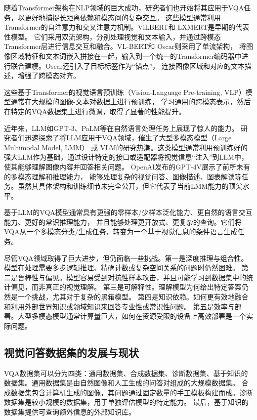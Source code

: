 随着Transformer架构在NLP领域的巨大成功，研究者们也开始将其应用于VQA任务，以更好地捕捉长距离依赖和模态间的复杂交互。
这些模型通常利用Transformer的自注意力和交叉注意力机制。ViLBERT\cite{lu2019vilbert}和 LXMERT\cite{tan2019lxmert}是早期的代表性模型。
它们采用双流架构，分别处理视觉和文本输入，并通过跨模态Transformer层进行信息交互和融合。VL-BERT\cite{su2019vl}和 Oscar\cite{li2020oscar}则采用了单流架构，
将图像区域特征和文本词嵌入拼接在一起，输入到一个统一的Transformer编码器中进行联合建模。Oscar还引入了目标标签作为“锚点”，
连接图像区域和对应的文本描述，增强了跨模态对齐。

这些基于Transformer的视觉语言预训练（Vision-Language Pre-training, VLP）模型通常在大规模的图像-文本对数据上进行预训练，
学习通用的跨模态表示，然后在特定的VQA数据集上进行微调，取得了显著的性能提升。

近年来，LLM如GPT-3、PaLM等在自然语言处理任务上展现了惊人的能力。
研究者们迅速探索了将LLM应用于VQA领域，催生了大型多模态模型（Large Multimodal Model, LMM） 或 
VLM的研究热潮。这类模型通常利用预训练好的强大LLM作为基础，通过设计特定的接口或适配器将视觉信息“注入”到LLM中，使其能够理解图像内容并回答相关问题。
OpenAI发布的GPT-4V\cite{openai2023gpt4v}展示了前所未有的多模态理解和推理能力，
能够处理复杂的视觉问答、图像描述、图表解读等任务。虽然其具体架构和训练细节未完全公开，但它代表了当前LMM能力的顶尖水平。

基于LLM的VQA模型通常具有更强的零样本/少样本泛化能力、更自然的语言交互能力、更好的常识推理能力，
并且能够处理更开放式、更复杂的查询。它们将VQA从一个多模态分类/生成任务，转变为一个基于视觉信息的条件语言生成任务。

尽管VQA领域取得了巨大进步，但仍面临一些挑战。第一是深度推理与组合性。模型在处理需要多步逻辑推理、精确计数或复杂空间关系的问题时仍然困难。
第二是鲁棒性与偏见。模型容易受到对抗性样本攻击，并且可能学习到数据集中的统计偏见，而非真正的视觉理解。
第三是可解释性。理解模型为何给出特定答案仍然是一个挑战，尤其对于复杂的黑箱模型。
第四是知识依赖。如何更有效地融合和利用外部世界知识或领域知识来回答专业性或常识性问题。
第五是效率与部署。大型多模态模型通常计算量巨大，如何在资源受限的设备上高效部署是一个实际问题。

\subsection{视觉问答数据集的发展与现状}
VQA数据集可以分为四类：通用数据集、合成数据集、诊断数据集、基于知识的数据集。通用数据集是由自然图像和人工生成的问答对组成的大规模数据集。
合成数据集包含计算机生成的图像，其问题通过固定数量的手工模板构建而成。诊断数据集是较小规模的数据集，用于单独评估模型的特定能力。
最后，基于知识的数据集提供可查询额外信息的外部知识库。
